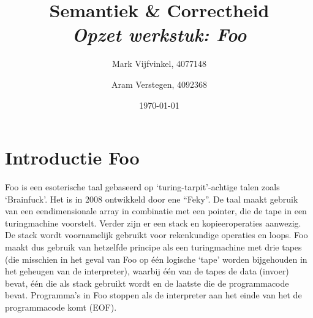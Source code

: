 \documentclass[11pt]{article}
\title{\textbf{Semantiek \& Correctheid \\ \emph{Opzet werkstuk: Foo}}}
\author{
	Mark Vijfvinkel, 4077148
	\and Aram Verstegen, 4092368
}
\date{\today}
\begin{document}
\maketitle


\section{Introductie Foo}

Foo is een esoterische taal gebaseerd op `turing-tarpit'-achtige talen zoals `Brainfuck'. Het is in 2008 ontwikkeld door ene ``Feky''.
De taal maakt gebruik van een eendimensionale array in combinatie met een pointer, die de tape in een turingmachine voorstelt.
Verder zijn er een stack en kopieeroperaties aanwezig.
De stack wordt voornamelijk gebruikt voor rekenkundige operaties en loops.
Foo maakt dus gebruik van hetzelfde principe als een turingmachine met drie tapes (die misschien in het geval van Foo op \'e\'en logische `tape' worden bijgehouden in het geheugen van de interpreter), waarbij \'e\'en van de tapes de data (invoer) bevat, \'e\'en die als stack gebruikt wordt en de laatste die de programmacode bevat. %
Programma's in Foo stoppen als de interpreter aan het einde van het de programmacode komt (EOF).
\end{document}
